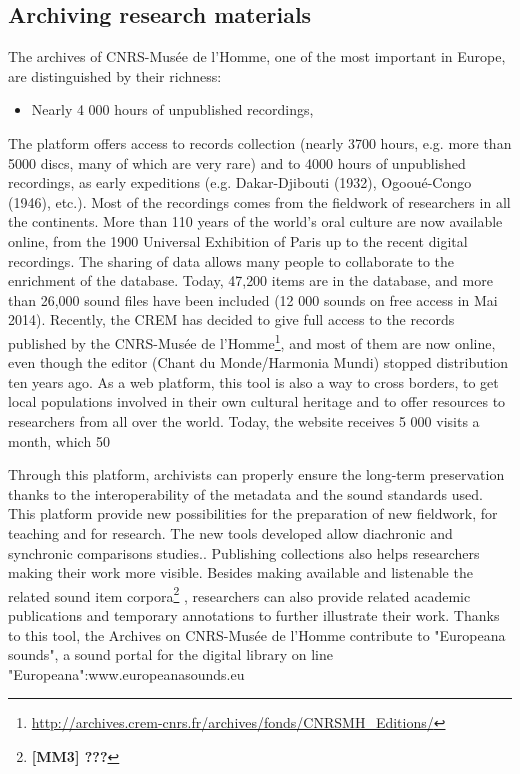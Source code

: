 \documentclass{sig-alternate}
\newcommand{\comment}[1]{\footnote{\color{red} \bf{{#1}}}}
\begin{document}
\subsection{Archiving research materials}
The archives of CNRS-Musée de l’Homme, one of the most important in Europe, are distinguished by their richness:
\begin{itemize}
\item Nearly 4 000 hours of unpublished recordings,
\end{itemize}
The platform offers access to records collection (nearly 3700 hours, e.g. more than 5000 discs, many of which are very rare) and to 4000 hours of unpublished recordings, as early expeditions (e.g. Dakar-Djibouti (1932), Ogooué-Congo (1946), etc.). Most of the recordings comes from the fieldwork of researchers in all the continents. 
More than 110 years of the world's oral culture are now available online, from the 1900 Universal Exhibition of Paris up to the recent digital recordings. The sharing of data allows many people to collaborate to the enrichment of the database. Today, 47,200 items are in the database, and more than 26,000 sound files have been included (12 000 sounds on free access in Mai 2014). Recently, the CREM has decided to give full access to the records published by the CNRS-Musée de l’Homme\footnote{\url{http://archives.crem-cnrs.fr/archives/fonds/CNRSMH_Editions/}}, and most of them are now online, even though the editor (Chant du Monde/Harmonia Mundi) stopped distribution ten years ago. 
As a web platform, this tool is also a way to cross borders, to get local populations involved in their own cultural heritage and to offer resources to researchers from all over the world. Today, the website receives 5 000 visits a month, which 50%
 
Through this platform, archivists can properly ensure the long-term preservation thanks to the interoperability of the metadata and the sound standards used.
This platform provide new possibilities for the preparation of new fieldwork, for teaching and for research. The new tools developed allow diachronic and synchronic comparisons studies..
Publishing collections also helps researchers making their work more visible. Besides making available and listenable the related sound item corpora\comment{[MM3] ???} , researchers can also provide related academic publications and temporary annotations to further illustrate their work.
Thanks to this tool, the Archives on CNRS-Musée de l'Homme contribute to "Europeana sounds", a sound portal for the digital library on line "Europeana":www.europeanasounds.eu
\end{document}
